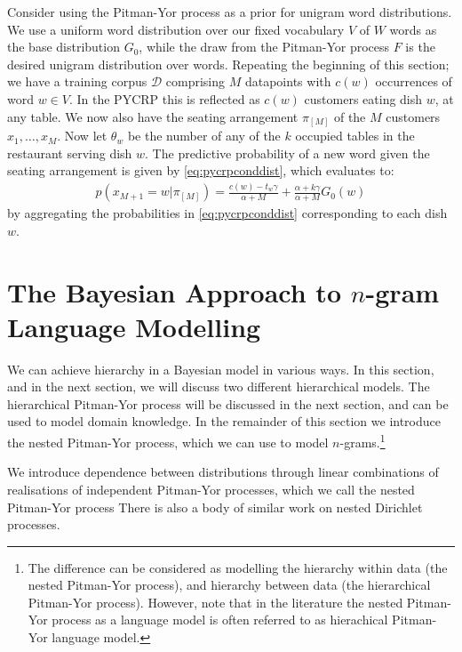 Consider using the Pitman-Yor process as a prior for unigram word distributions. We use a uniform word distribution over our fixed vocabulary $V$ of $W$ words as the base distribution $G_0$, while the draw from the Pitman-Yor process $F$ is the desired unigram distribution over words. Repeating the beginning of this section; we have  a training corpus $\mathcal{D}$ comprising $M$ datapoints with $c(w)$ occurrences of word $w\in V$. In the PYCRP this is reflected as $c(w)$ customers eating dish $w$, at any table. We now also have the seating arrangement $\pi_{[M]}$ of the $M$ customers $x_1, \ldots, x_M$. Now let $\theta_w$ be the number of any of the $k$ occupied tables in the restaurant serving dish $w$. The predictive probability of a new word given the seating arrangement is given by \cref{eq:pycrpconddist}, which evaluates to:
\begin{align}
	p(x_{M+1} = w | \pi_{[M]}) = \frac{c(w)-t_w\gamma}{\alpha+M}+\frac{\alpha+k\gamma}{\alpha+M}G_0(w)
\end{align}
by aggregating the probabilities in \cref{eq:pycrpconddist} corresponding to each dish $w$. 


\section{The Bayesian Approach to $n$-gram Language Modelling}

We can achieve hierarchy in a Bayesian model in various ways. In this section, and in the next section, we will discuss two different hierarchical models. The hierarchical Pitman-Yor process will be discussed in the next section, and can be used to model domain knowledge. In the remainder of this section we introduce the nested Pitman-Yor process, which we can use to model $n$-grams.\footnote{The difference can be considered as modelling the hierarchy within data (the nested Pitman-Yor process), and hierarchy between data (the hierarchical Pitman-Yor process). However, note that in the literature the nested Pitman-Yor process as a language model is often referred to as hierachical Pitman-Yor language model.} 

We introduce dependence between distributions through linear combinations of realisations of independent Pitman-Yor processes, which we call the nested Pitman-Yor  process\cite{Teh2006AHierarchical,Teh2006ATechnical} There is also a body of similar work on nested Dirichlet processes.\cite{Blei2010The,Rodriguez2008The}

